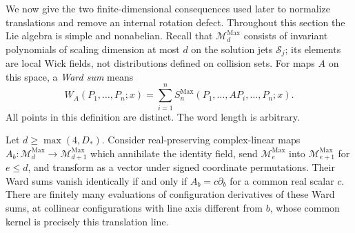 We now give the two finite-dimensional consequences used later to
normalize translations and remove an internal rotation defect.
Throughout this section the Lie algebra is simple and nonabelian.
Recall that $\mathcal M_d^{\mathrm{Max}}$ consists of invariant
polynomials of scaling dimension at most $d$ on the solution jets $\mathcal S_j$;
its elements are local Wick fields, not distributions defined on collision
sets. For maps $A$ on this space, a \emph{Ward sum} means
\[
 W_A(P_1,\ldots,P_n;x)=\sum_{i=1}^n
 S_n^{\mathrm{Max}}(P_1,\ldots,AP_i,\ldots,P_n;x).
\]
All points in this definition are distinct. The word length is arbitrary.

\begin{theorem}\label{ch03:vector-tests}
Let $d\ge\max(4,D_*)$. Consider real-preserving complex-linear maps
$A_b:\mathcal M_d^{\mathrm{Max}}\to\mathcal M_{d+1}^{\mathrm{Max}}$
which annihilate the identity field, send $\mathcal M_e^{\mathrm{Max}}$ into
$\mathcal M_{e+1}^{\mathrm{Max}}$ for $e\le d$, and transform as a vector
under signed coordinate permutations. Their Ward sums vanish identically
if and only if $A_b=c\partial_b$ for a common real scalar $c$.
There are finitely many evaluations of configuration derivatives of these
Ward sums, at collinear configurations with line axis different from
$b$, whose common kernel is precisely this translation line.
\end{theorem}

